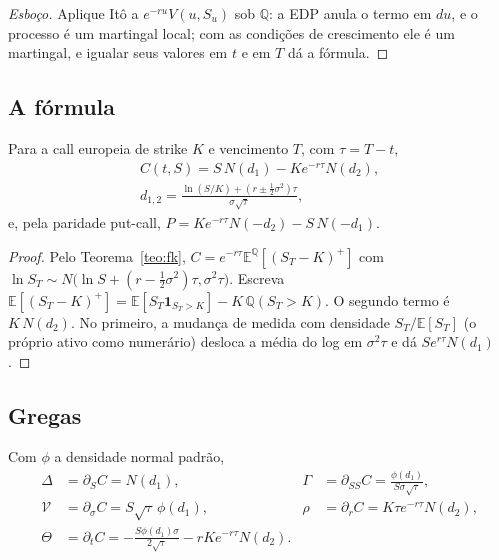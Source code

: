 \begin{proof}[Esboço]
Aplique Itô a $e^{-ru}V(u,S_u)$ sob $\mathbb Q$: a EDP anula o termo em $du$, e o processo é um martingal local; com as condições de crescimento ele é um martingal, e igualar seus valores em $t$ e em $T$ dá a fórmula.
\end{proof}

\subsection{A fórmula}

\begin{proposicao}
Para a call europeia de strike $K$ e vencimento $T$, com $\tau=T-t$,
\begin{gather}
C(t,S)=S\,N(d_1)-Ke^{-r\tau}N(d_2),\\
d_{1,2}=\frac{\ln(S/K)+(r\pm\tfrac12\sigma^2)\tau}{\sigma\sqrt\tau},
\end{gather}
e, pela paridade put-call, $P=Ke^{-r\tau}N(-d_2)-S\,N(-d_1)$.
\end{proposicao}

\begin{proof}
Pelo Teorema~\ref{teo:fk}, $C=e^{-r\tau}\mathbb E^{\mathbb Q}[(S_T-K)^+]$ com $\ln S_T\sim N\big(\ln S+(r-\tfrac12\sigma^2)\tau,\sigma^2\tau\big)$. Escreva $\mathbb E[(S_T-K)^+]=\mathbb E[S_T\mathbf 1_{S_T>K}]-K\,\mathbb Q(S_T>K)$. O segundo termo é $K\,N(d_2)$. No primeiro, a mudança de medida com densidade $S_T/\mathbb E[S_T]$ (o próprio ativo como numerário) desloca a média do log em $\sigma^2\tau$ e dá $Se^{r\tau}N(d_1)$.
\end{proof}

\subsection{Gregas}

\begin{proposicao}
Com $\phi$ a densidade normal padrão,
\begin{align}
\Delta&=\partial_SC=N(d_1), & \Gamma&=\partial_{SS}C=\frac{\phi(d_1)}{S\sigma\sqrt\tau},\\
\mathcal V&=\partial_\sigma C=S\sqrt\tau\,\phi(d_1), & \rho&=\partial_rC=K\tau e^{-r\tau}N(d_2),\\
\Theta&=\partial_tC=-\frac{S\phi(d_1)\sigma}{2\sqrt\tau}-rKe^{-r\tau}N(d_2).
\end{align}
\end{proposicao}

